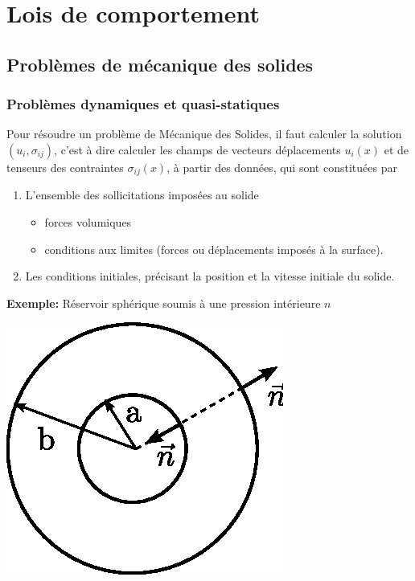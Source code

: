 \chapter{Lois de comportement}
\section{Problèmes de mécanique des solides} \label{sec:Ch4-1}
\subsection{Problèmes dynamiques et quasi-statiques}  \label{ssec:Ch4-1.1}
Pour résoudre un problème de Mécanique des Solides, il faut calculer la solution $(u_i, \sigma_{ij})$, c'est à dire calculer les champs de vecteurs déplacements $u_i(x)$ et de tenseurs des contraintes $\sigma_{ij}(x)$, à partir des données, qui sont constituées par
\begin{enumerate}
    \item L'ensemble des sollicitations imposées au solide
        \begin{itemize}
            \item forces volumiques
            \item conditions aux limites (forces ou déplacements imposés à la surface).
        \end{itemize}
    \item Les conditions initiales, précisant la position et la vitesse initiale du solide.
\end{enumerate}
\textbf{Exemple:} Réservoir sphérique soumis à une pression intérieure $n$
\begin{center}
    \includegraphics{../images/T1_Ch04-0001}
\end{center}
